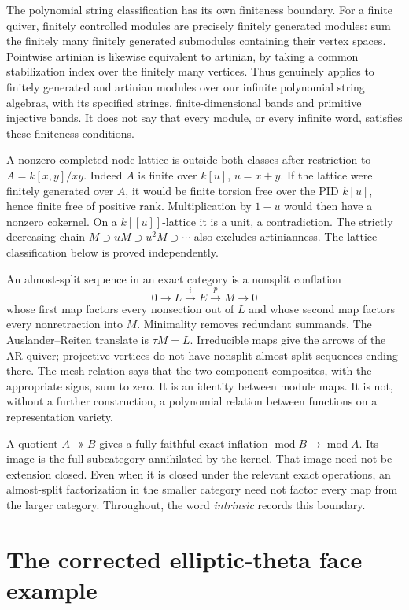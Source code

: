 \documentclass[11pt,oneside,openany]{book}
\theoremstyle{definition}\newtheorem{definition}[theorem]{Definition}
\theoremstyle{remark}\newtheorem{remark}[theorem]{Remark}
\begin{document}
The polynomial string classification has its own finiteness boundary.
For a finite quiver, finitely controlled modules are precisely finitely generated
modules: sum the finitely many finitely generated submodules containing their
vertex spaces. Pointwise artinian is likewise equivalent to artinian, by taking
a common stabilization index over the finitely many vertices. Thus
\cite[Theorems 1.2--1.4]{ARBCrawleyBoevey} genuinely applies to finitely generated
and artinian modules over our infinite polynomial string algebras, with its
specified strings, finite-dimensional bands and primitive injective bands.
It does not say that every module, or every infinite word, satisfies these
finiteness conditions.

A nonzero completed node lattice is outside both classes after restriction to
$A=k[x,y]/xy$. Indeed $A$ is finite over $k[u]$, $u=x+y$. If the lattice
were finitely generated over $A$, it would be finite torsion free over the PID
$k[u]$, hence finite free of positive rank. Multiplication by $1-u$ would then
have a nonzero cokernel. On a $k[[u]]$-lattice it is a unit, a contradiction.
The strictly decreasing chain $M\supset uM\supset u^2M\supset\cdots$ also
excludes artinianness. The lattice classification below is proved independently.

An almost-split sequence in an exact category is a nonsplit conflation
\[
 0\longrightarrow L\xrightarrow{i}E\xrightarrow{p}M\longrightarrow0
\]
whose first map factors every nonsection out of $L$ and whose second map factors
every nonretraction into $M$. Minimality removes redundant summands. The
Auslander--Reiten translate is $\tau M=L$. Irreducible maps give the arrows of
the AR quiver; projective vertices do not have nonsplit almost-split sequences
ending there. The mesh relation says that the two component composites, with
the appropriate signs, sum to zero. It is an identity between module maps.
It is not, without a further construction, a polynomial relation between
functions on a representation variety.

A quotient $A\twoheadrightarrow B$ gives a fully faithful exact inflation
$\operatorname{mod}B\to\operatorname{mod}A$. Its image is the full subcategory
annihilated by the kernel. That image need not be extension closed. Even when
it is closed under the relevant exact operations, an almost-split factorization
in the smaller category need not factor every map from the larger category.
Throughout, the word \emph{intrinsic} records this boundary.

\section{The corrected elliptic-theta face example}
\end{document}

